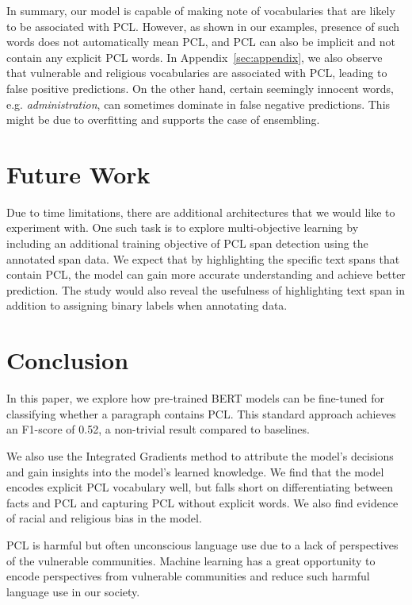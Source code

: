 \documentclass[11pt]{article}
\begin{document}
In summary, our model is capable of making note of vocabularies that are likely to be associated with PCL. However, as shown in our examples, presence of such words does not automatically mean PCL, and PCL can also be implicit and not contain any explicit PCL words. In Appendix~\ref{sec:appendix}, we also observe that vulnerable and religious vocabularies are associated with PCL, leading to false positive predictions. On the other hand, certain seemingly innocent words, e.g. \textit{administration}, can sometimes dominate in false negative predictions. This might be due to overfitting and supports the case of ensembling.

\section{Future Work}

Due to time limitations, there are additional architectures that we would like to experiment with. One such task is to explore multi-objective learning by including an additional training objective of PCL span detection using the annotated span data. We expect that by highlighting the specific text spans that contain PCL, the model can gain more accurate understanding and achieve better prediction. The study would also reveal the usefulness of highlighting text span in addition to assigning binary labels when annotating data.

\section{Conclusion}

In this paper, we explore how pre-trained BERT models can be fine-tuned for classifying whether a paragraph contains PCL. This standard approach achieves an F1-score of 0.52, a non-trivial result compared to baselines. 

We also use the Integrated Gradients method to attribute the model’s decisions and gain insights into the model’s learned knowledge. We find that the model encodes explicit PCL vocabulary well, but falls short on differentiating between facts and PCL and capturing PCL without explicit words. We also find evidence of racial and religious bias in the model.

PCL is harmful but often unconscious language use due to a lack of perspectives of the vulnerable communities. Machine learning has a great opportunity to encode perspectives from vulnerable communities and reduce such harmful language use in our society.
\end{document}

